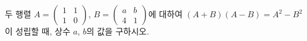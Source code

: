 두 행렬 $A=\begin{pmatrix} 1 & 1 \\ 1 & 0 \end{pmatrix}$, $B=\begin{pmatrix} a & b \\ 4 & 1 \end{pmatrix}$에 대하여 $(A+B)(A-B)=A^2-B^2$이 성립할 때, 상수 $a$, $b$의 값을 구하시오.
